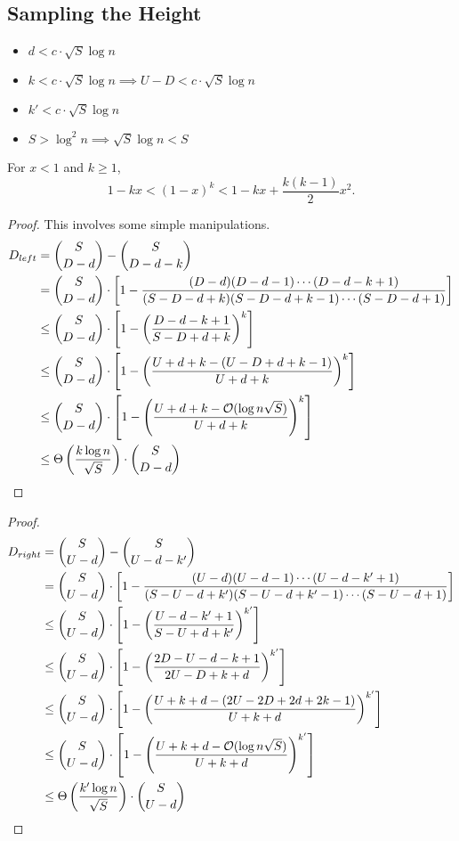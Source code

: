\subsection{Sampling the Height}%
\label{sub:sampling_the_height}


\begin{itemize}
    \item $d < c\cdot \sqrt S \log n$
    \item $k < c\cdot \sqrt S \log n \implies U-D < c\cdot \sqrt S \log n$
    \item $k' < c\cdot \sqrt S \log n$
    \item $S > \log^2 n \implies \sqrt S \log n < S$
\end{itemize}

\begin{lemma}
\label{lem:taylor_bound}
For $x < 1$ and $k\ge 1$,
\[
1-kx < (1-x)^k < 1 - kx + \frac{k(k-1)}{2}x^2.
\]
\end{lemma}


\DLeftBound*
\begin{proof}
This involves some simple manipulations.
\begin{align}
D_{left} &= {{S}\choose{D-d}}-{{S}\choose{D-d-k}}\\
&= {{S}\choose{D-d}}\cdot \left[1-\frac{(D-d)(D-d-1)\cdots(D-d-k+1)}{(S-D-d+k)(S-D-d+k-1)\cdots(S-D-d+1)}\right]\\
&\le {{S}\choose{D-d}}\cdot \left[1-\left(\frac{D-d-k+1}{S-D+d+k}\right)^k\right]\\
&\le {{S}\choose{D-d}}\cdot \left[1-\left(\frac{U+d+k-(U-D+d+k-1)}{U+d+k}\right)^k\right]\\
&\le {{S}\choose{D-d}}\cdot \left[1-\left(\frac{U+d+k-\Bo(\log n\sqrt{S})}{U+d+k}\right)^k\right]\\
&\le \Theta \left( \frac{k\log n}{\sqrt{S}} \right) \cdot{{S}\choose{D-d}}
\end{align}
\end{proof}

\DRightBound*
\begin{proof}
\begin{align}
D_{right} &= {{S}\choose{U-d}}-{{S}\choose{U-d-k'}}\\
&= {{S}\choose{U-d}}\cdot \left[1-\frac{(U-d)(U-d-1)\cdots(U-d-k'+1)}{(S-U-d+k')(S-U-d+k'-1)\cdots(S-U-d+1)}\right]\\
&\le {{S}\choose{U-d}}\cdot \left[1-\left(\frac{U-d-k'+1}{S-U+d+k'}\right)^{k'}\right]\\
&\le {{S}\choose{U-d}}\cdot \left[1-\left(\frac{2D-U-d-k+1}{2U-D+k+d}\right)^{k'}\right]\\
&\le {{S}\choose{U-d}}\cdot \left[1-\left(\frac{U+k+d - (2U-2D+2d+2k-1)}{U+k+d}\right)^{k'}\right]\\
&\le {{S}\choose{U-d}}\cdot \left[1-\left(\frac{U+k+d - \Bo(\log n\sqrt S)}{U+k+d}\right)^{k'}\right]\\
&\le \Theta\left(\frac{k'\log n}{\sqrt{S}}\right)\cdot{{S}\choose{U-d}}
\end{align}
\end{proof}

